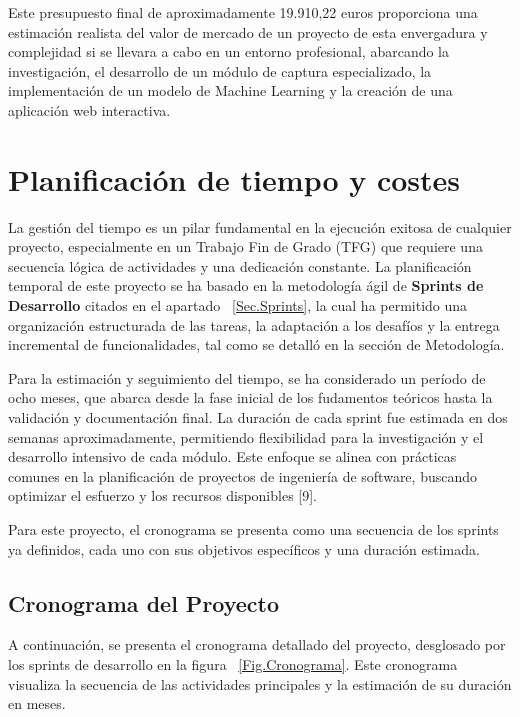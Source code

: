 

Este presupuesto final de aproximadamente 19.910,22 euros proporciona una estimación realista del valor de mercado de un proyecto de esta envergadura y complejidad si se llevara a cabo en un entorno profesional, abarcando la investigación, el desarrollo de un módulo de captura especializado, la implementación de un modelo de Machine Learning y la creación de una aplicación web interactiva.

\section{Planificación de tiempo y costes}
La gestión del tiempo es un pilar fundamental en la ejecución exitosa de cualquier proyecto, especialmente en un Trabajo Fin de Grado (TFG) que requiere una secuencia lógica de actividades y una dedicación constante. La planificación temporal de este proyecto se ha basado en la metodología ágil de \textbf{Sprints de Desarrollo} citados en el apartado ~\ref{Sec.Sprints}, la cual ha permitido una organización estructurada de las tareas, la adaptación a los desafíos y la entrega incremental de funcionalidades, tal como se detalló en la sección de Metodología.

Para la estimación y seguimiento del tiempo, se ha considerado un período de ocho meses, que abarca desde la fase inicial de los fudamentos teóricos hasta la validación y documentación final. La duración de cada sprint fue estimada en dos semanas aproximadamente, permitiendo flexibilidad para la investigación y el desarrollo intensivo de cada módulo. Este enfoque se alinea con prácticas comunes en la planificación de proyectos de ingeniería de software, buscando optimizar el esfuerzo y los recursos disponibles [9].

Para este proyecto, el cronograma se presenta como una secuencia de los sprints ya definidos, cada uno con sus objetivos específicos y una duración estimada.

\subsection{Cronograma del Proyecto}

A continuación, se presenta el cronograma detallado del proyecto, desglosado por los sprints de desarrollo en la figura ~\ref{Fig.Cronograma}. Este cronograma visualiza la secuencia de las actividades principales y la estimación de su duración en meses.

